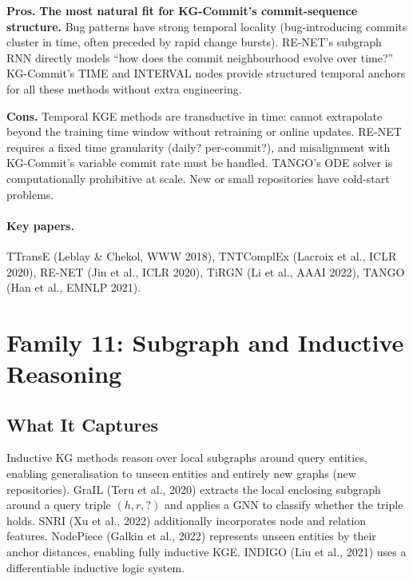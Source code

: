 \documentclass[12pt,a4paper]{article}
\begin{document}
\begin{prosbox}
\textbf{Pros.}
\textbf{The most natural fit for KG-Commit's commit-sequence structure.}
Bug patterns have strong temporal locality (bug-introducing commits cluster
in time, often preceded by rapid change bursts). RE-NET's subgraph RNN
directly models ``how does the commit neighbourhood evolve over time?''
KG-Commit's TIME and INTERVAL nodes provide structured temporal anchors
for all these methods without extra engineering.
\end{prosbox}

\begin{consbox}
\textbf{Cons.}
Temporal KGE methods are transductive in time: cannot extrapolate beyond
the training time window without retraining or online updates. RE-NET requires
a fixed time granularity (daily? per-commit?), and misalignment with
KG-Commit's variable commit rate must be handled. TANGO's ODE solver is
computationally prohibitive at scale. New or small repositories have
cold-start problems.
\end{consbox}

\paragraph{Key papers.} TTransE (Leblay \& Chekol, WWW 2018), TNTComplEx
(Lacroix et al., ICLR 2020), RE-NET (Jin et al., ICLR 2020), TiRGN (Li et al.,
AAAI 2022), TANGO (Han et al., EMNLP 2021).

\section{Family 11: Subgraph and Inductive Reasoning}

\subsection{What It Captures}

Inductive KG methods reason over local subgraphs around query entities,
enabling generalisation to unseen entities and entirely new graphs (new
repositories). GraIL (Teru et al., 2020) extracts the local enclosing
subgraph around a query triple $(h, r, ?)$ and applies a GNN to classify
whether the triple holds. SNRI (Xu et al., 2022) additionally incorporates
node and relation features. NodePiece (Galkin et al., 2022) represents unseen
entities by their anchor distances, enabling fully inductive KGE.
INDIGO (Liu et al., 2021) uses a differentiable inductive logic system.
\end{document}
